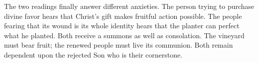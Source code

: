The two readings finally answer different anxieties. The person trying to purchase divine favor hears that Christ's gift makes fruitful action possible. The people fearing that its wound is its whole identity hears that the planter can perfect what he planted. Both receive a summons as well as consolation. The vineyard must bear fruit; the renewed people must live its communion. Both remain dependent upon the rejected Son who is their cornerstone.
